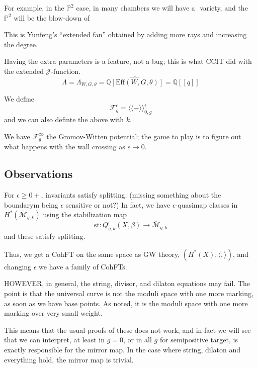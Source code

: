 \documentclass{amsart}
\theoremstyle{definition}
\newcommand{\proj}{\mathbb{P}}
\newcommand{\J}{\mathcal{J}}
\newcommand{\Mbar}{\overline{\mathcal{M}}}
\newcommand{\Q}{\mathbb{Q}}
\newcommand{\st}{\text{st}}
\begin{document}
For example, in the $\proj^2$ case, in many chambers we will have a $ $ variety, and the $\proj^2$ will be the blow-down of 

This is Yunfeng's ``extended fan'' obtained by adding more rays and increasing the degree.

Having the extra parameters is a feature, not a bug; this is what CCIT did with the extended $\J$-function.
$$\Lambda=\Lambda_{W,G,\theta}=\hat{\Q[\text{Eff}(W,G,\theta)]}=\Q[[q]]$$ 


We define 
$$\mathcal{F}_g^\epsilon=\langle\langle - \rangle\rangle^\epsilon_{0,g}$$
and we can also definte the above with $k$.

We have $\mathcal{F}_g^\infty$ the Gromov-Witten potential; the game to play is to figure out what happens with the wall crossing as $\epsilon\to 0$.

\subsection{Observations}

 For $\epsilon\geq 0+$, invariants satisfy splitting.  (missing something about the boundarym being $\epsilon$ sensitive or not?)
In fact, we have $\epsilon$-quasimap classes in $H^*(\Mbar_{g,k})$ using
the stabilization map
$$\st:Q^\epsilon_{g,k}(X,\beta)\to \Mbar_{g,k}$$
and these satisfy splitting.

Thus, we get a CohFT on the same space as GW theory, $(H^*(X),\langle, \rangle)$, and changing $\epsilon$ we have a family of CohFTs.

HOWEVER, in general, the string, divisor, and dilaton equations may fail.  The point is that the universal curve is not the moduli space with one more marking, as soon as we have base points.  As noted, it is the moduli space with one more marking over very small weight. 

This means that the usual proofs of these does not work, and in fact we will see that we can interpret, at least in $g=0$, or in all $g$ for semipositive target, is exactly responsible for the mirror map.  In the case where string, dilaton and everything hold, the mirror map is trivial.
\end{document}
